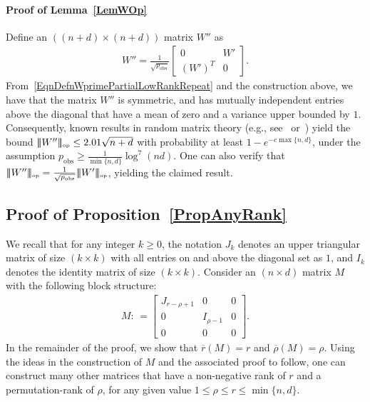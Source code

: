 \documentclass[11pt, hidelinks]{article} %
\newcommand{\matsnorm}[2]{|\!|\!| #1 | \! | \!|_{{#2}}}
\newcommand{\opnorm}[1]{\ensuremath{\matsnorm{#1}{\mbox{\tiny{op}}}}}
\newcommand{\defn}{\ensuremath{:\,=}}
\newcommand{\upperonesmx}{J}
\newcommand{\identitymx}{I}
\newcommand{\numrows}{n}
\newcommand{\numcols}{d}
\newcommand{\plaincon}{c}
\newcommand{\wtmatrix}{M}
\newcommand{\pp}{\ensuremath{p_{\mathrm{obs}}}}
\newcommand{\nnrank}{r}
\newcommand{\permrank}{\rho}
\newcommand{\fnpermrank}[1]{\overline{\permrank}(#1)}
\newcommand{\fnnnrank}[1]{\overline{\nnrank}(#1)}
\newcommand{\noise}{W}
\begin{document}

\paragraph*{Proof of Lemma~\ref{LemWOp}}
Define an $((\numrows+\numcols)\times(\numrows+\numcols))$ matrix
$\noise''$ as
\begin{align*}
\noise'' = 
\frac{1}{\sqrt{\pp}}
\begin{bmatrix}
0 & \noise' \\ (\noise')^T & 0
\end{bmatrix}.
\end{align*}
From~\eqref{EqnDefnWprimePartialLowRankRepeat} and the construction
above, we have that the matrix $\noise''$ is symmetric, and has mutually
independent entries above the diagonal that have a mean of zero and a
variance upper bounded by $1$. Consequently, known results in random
matrix theory (e.g., see~\cite[Theorem 3.4]{chatterjee2014matrix}
or~\cite[Theorem 2.3.21]{tao2012topics}) yield the bound
$\opnorm{\noise''} \leq 2.01 \sqrt{\numrows + \numcols}$ with
probability at least $1 - e^{-\plaincon \max\{\numrows,
  \numcols\}}$, under the assumption $\pp \geq \frac{1}{\min\{\numrows,\numcols\}}\log^7(\numrows \numcols)$. One can also verify that
$\opnorm{\noise''} = \frac{1}{\sqrt{\pp}}\opnorm{\noise'}$, yielding
the claimed result.


\subsection{Proof of Proposition~\ref{PropAnyRank}}

We recall that for any integer $k \geq 0$, the notation
$\upperonesmx_{k}$ denotes an upper triangular matrix of size $(k
\times k)$ with all entries on and above the diagonal set as $1$, and
$\identitymx_{k}$ denotes the identity matrix of size $(k \times
k)$. Consider an $(\numrows \times \numcols)$
matrix $\wtmatrix$ with the following block structure:
\begin{align*}
\wtmatrix \defn \begin{bmatrix} \upperonesmx_{\nnrank - \permrank + 1}
  & 0 & 0\\ 0 & \identitymx_{\permrank - 1} & 0\\ 0 & 0 & 0
\end{bmatrix}.
\end{align*}
In the remainder of the proof, we show that $\fnnnrank{\wtmatrix} =
\nnrank$ and $\fnpermrank{\wtmatrix} = \permrank$. Using the ideas in
the construction of $\wtmatrix$ and the associated proof to follow,
one can construct many other matrices that have a non-negative rank of $\nnrank$ and a permutation-rank of $\permrank$, for any given value $1 \leq \permrank \leq \nnrank \leq
\min\{\numrows,\numcols\}$.
\end{document}
